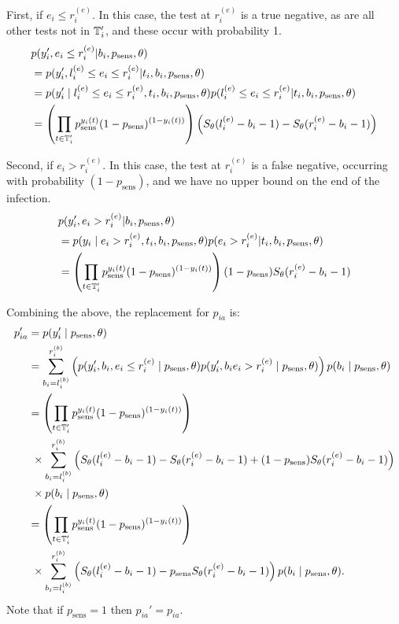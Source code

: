\documentclass[thesis.tex]{subfiles}
\begin{document}
First, if $e_i \leq r_i^{(e)}$.
In this case, the test at $r_i^{(e)}$ is a true negative, as are all other tests not in $\mathbb{T}'_i$, and these occur with probability 1.
\begin{align}
&p(y_i', e_i \leq r_i^{(e)} | b_i, p_\text{sens}, \theta) \\
&= p(y_i', l_i^{(e)} \leq e_i \leq r_i^{(e)} | t_i, b_i, p_\text{sens}, \theta) \\ %
&= p(y_i' \mid l_i^{(e)} \leq e_i \leq r_i^{(e)}, t_i, b_i, p_\text{sens}, \theta) p(l_i^{(e)} \leq e_i \leq r_i^{(e)} | t_i, b_i, p_\text{sens}, \theta) \\
&= \left( \prod_{t \in \sched'_i} p_\text{sens}^{y_i(t)} (1 - p_\text{sens})^{(1 - y_i(t))} \right) \left( S_\theta(l_i^{(e)} - b_i - 1) - S_\theta(r_i^{(e)} - b_i - 1) \right)
\end{align}

Second, if $e_i > r_i^{(e)}$.
In this case, the test at $r_i^{(e)}$ is a false negative, occurring with probability $(1 - p_\text{sens})$, and we have no upper bound on the end of the infection.
\begin{align}
&p(y_i', e_i > r_i^{(e)} | b_i, p_\text{sens}, \theta) \\
&= p(y_i \mid e_i > r_i^{(e)}, t_i, b_i, p_\text{sens}, \theta) p(e_i > r_i^{(e)} | t_i, b_i, p_\text{sens}, \theta) \\
&= \left( \prod_{t \in \mathbb{T}'_i} p_\text{sens}^{y_i(t)} (1 - p_\text{sens})^{(1 - y_i(t))} \right) (1 - p_\text{sens}) S_\theta(r_i^{(e)} - b_i - 1)
\end{align}

Combining the above, the replacement for $p_{ia}$ is:
\begin{align}
p_{ia}'
&= p(y_i' \mid p_\text{sens}, \theta) \\
&= \sum_{b_i = l_i^{(b)}}^{r_i^{(b)}} \left( p(y_i', b_i, e_i \leq r_i^{(e)} \mid p_\text{sens}, \theta) p(y_i', b_i e_i > r_i^{(e)} \mid p_\text{sens}, \theta) \right) p(b_i \mid p_\text{sens}, \theta) \\
&= \left( \prod_{t \in \mathbb{T}'_i} p_\text{sens}^{y_i(t)} (1 - p_\text{sens})^{(1 - y_i(t))} \right) \\ & \ \times \sum_{b_i = l_i^{(b)}}^{r_i^{(b)}} \left( S_\theta(l_i^{(e)} - b_i - 1) - S_\theta(r_i^{(e)} - b_i - 1) + (1 - p_\text{sens}) S_\theta(r_i^{(e)} - b_i - 1) \right) \\ & \ \times p(b_i \mid p_\text{sens}, \theta) \\
&= \left( \prod_{t \in \mathbb{T}'_i} p_\text{sens}^{y_i(t)} (1 - p_\text{sens})^{(1 - y_i(t))} \right) \\ & \ \times \sum_{b_i = l_i^{(b)}}^{r_i^{(b)}} \left( S_\theta(l_i^{(e)} - b_i - 1) - p_\text{sens} S_\theta(r_i^{(e)} - b_i - 1) \right) p(b_i \mid p_\text{sens}, \theta).
\label{imperf-test:eq:pia-prime}
\end{align}
Note that if $p_\text{sens} = 1$ then $p_{ia}' = p_{ia}$.
\end{document}
